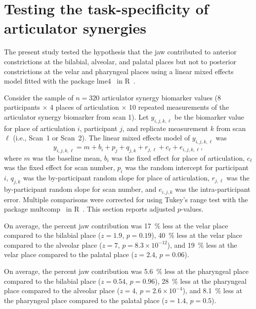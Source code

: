 \documentclass[preprint]{JASAnew}\usepackage[]{graphicx}\usepackage[]{color}
\begin{document}
\section{Testing the task-specificity of articulator synergies}
\label{sec:taskspec}

The present study tested the hypothesis that the jaw contributed to anterior constrictions at the bilabial, alveolar, and palatal places but not to posterior constrictions at the velar and pharyngeal places using a linear mixed effects model fitted with the package lme4~\citep{bates2015fitting} in R~\citep{r2017language}. 


Consider the sample of $n=320$ articulator synergy biomarker values (\num{8} participants $\times$ \num{4} places of articulation $\times$ \num{10} repeated measurements of the articulator synergy biomarker from scan \num{1}). Let $y_{i,j,k,\ell}$ be the biomarker value for place of articulation $i$, participant $j$, and replicate measurement $k$ from scan $\ell$ (i.e., Scan~\num{1} or Scan~\num{2}). The linear mixed effects model of $y_{i,j,k,\ell}$ was 
%
\begin{equation}
y_{i,j,k,\ell} = m + b_i + p_j + q_{j,k} + r_{j,\ell} + c_\ell + e_{i,j,k,\ell},
\end{equation}
%
where $m$ was the baseline mean, $b_i$ was the fixed effect for place of articulation, $c_\ell$ was the fixed effect for scan number, $p_i$ was the random intercept for participant $i$, $q_{j,k}$ was the by-participant random slope for place of articulation, $r_{j,\ell}$ was the by-participant random slope for scan number, and $e_{i,j,k}$ was the intra-participant error. Multiple comparisons were corrected for using Tukey's range test with the package multcomp~\citep{hothorn2008simultaneous} in R~\citep{r2017language}. This section reports adjusted $p$-values. 

%
On average, the percent jaw contribution was 
%
%
\SI{17}{\percent} 
less at the velar place compared to the bilabial place
($z=1.9$, 
$p=0.19$),
%
%
\SI{40}{\percent} 
less at the velar place compared to the alveolar place
($z=7$, 
$p=\ensuremath{8.3\times 10^{-12}}$), and
%
%
\SI{19}{\percent} 
less at the velar place compared to the palatal place
($z=2.4$, 
$p=0.06$).




%
On average, the percent jaw contribution was 
%
%
\SI{5.6}{\percent} 
less at the pharyngeal place compared to the bilabial place
($z=0.54$, 
$p=0.96$),
%
%
\SI{28}{\percent} 
less at the pharyngeal place compared to the alveolar place
($z=4$, 
$p=\ensuremath{2.6\times 10^{-4}}$), and
%
%
\SI{8.1}{\percent} 
less at the pharyngeal place compared to the palatal place
($z=1.4$, 
$p=0.5$).
\end{document}
